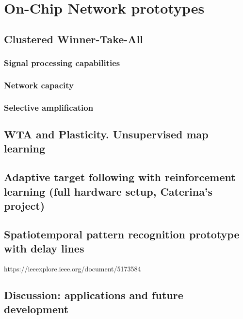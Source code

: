 \chapter{On-Chip Network prototypes}
\label{ch:temporal_decoding_prototype}

\section{Clustered Winner-Take-All}
\subsection{Signal processing capabilities}
\subsection{Network capacity}
\subsection{Selective amplification}

\section{WTA and Plasticity. Unsupervised map learning}

\section{Adaptive target following with reinforcement learning (full hardware setup, Caterina's project)}

\section{Spatiotemporal pattern recognition prototype with delay lines}

https://ieeexplore.ieee.org/document/5173584

\section{Discussion: applications and future development}